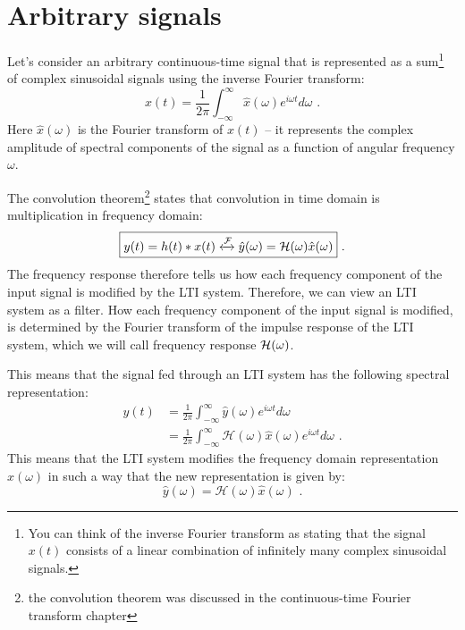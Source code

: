 \section{Arbitrary signals}

Let's consider an arbitrary continuous-time signal that is represented
as a sum\footnote{You can think of the inverse Fourier transform as stating
    that the signal $x(t)$ consists of a linear combination of infinitely many
    complex sinusoidal signals.} of complex sinusoidal signals using the inverse Fourier transform:
\begin{equation}
    x(t)  = \frac{1}{2\pi} \int_{-\infty}^{\infty} \hat{x}(\omega) e^{i \omega t} d\omega \,\,.
\end{equation}
Here $\hat{x}(\omega)$ is the Fourier transform of $x(t)$ -- it
represents the complex amplitude of spectral components of the signal
as a function of angular frequency $\omega$.

The convolution theorem\footnote{the convolution theorem was discussed
    in the continuous-time Fourier transform chapter} states that
convolution in time domain is multiplication in frequency domain:
\begin{equation}
    \boxed{
        y(t) = h(t)*x(t) \xleftrightarrow{\mathcal{F}} \hat{y}(\omega)=\mathcal{H}(\omega)\hat{x}(\omega)
    } \,\,.
\end{equation}
The frequency response therefore tells us how each frequency component
of the input signal is modified by the LTI system. Therefore, we can
view an LTI system as a filter. How each frequency component of the input
signal is modified, is determined by the Fourier transform of the impulse
response of the LTI system, which we will call 
frequency response $\mathcal{H}(\omega)$.


    This means that the signal fed through an LTI system has the following spectral representation:
    \begin{align}
        y(t) & = \frac{1}{2\pi} \int_{-\infty}^{\infty} \hat{y}(\omega) e^{i \omega t} d\omega                          \\
             & = \frac{1}{2\pi} \int_{-\infty}^{\infty} \mathcal{H}(\omega)\hat{x}(\omega) e^{i \omega t} d\omega \,\,.
    \end{align}
    This means that the LTI system modifies the frequency domain representation
    $\hat{x}(\omega)$ in such a way that the new representation is given by:
    \begin{equation}
        \boxed{
            \hat{y}(\omega) = \mathcal{H}(\omega)\hat{x}(\omega)
        } \,\,.
    \end{equation}
\fi


